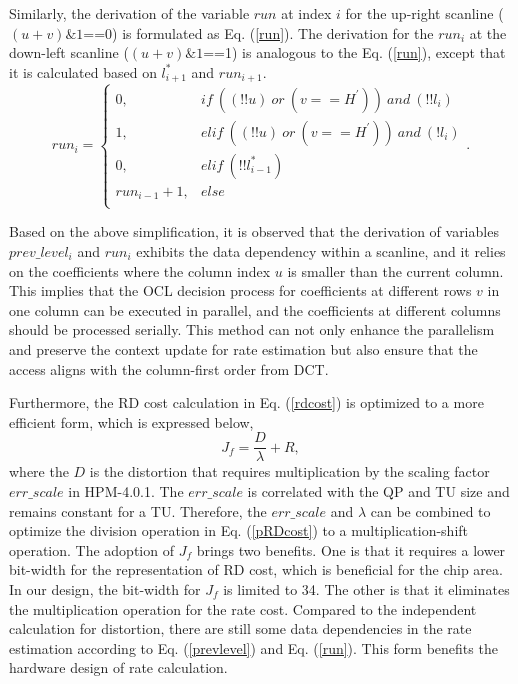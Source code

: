 \documentclass[lettersize,journal]{IEEEtran}
\begin{document}
Similarly, the derivation of the variable $run$ at index $i$ for the up-right scanline ($(u+v)\&1$==0) is formulated as Eq. (\ref{run}). The derivation for the $run_{i}$ at the down-left scanline ($(u+v)\&1$==1) is analogous to the Eq. (\ref{run}), except that it is calculated based on $l_{i+1}^{*}$ and $run_{i+1}$. 
\begin{equation}
	run_{i}=\begin{cases}
	\label{run}
	0,            & if \ ((!!u)\ or \ (v==H^{'}))\ and \ (!!l_{i}) \\
	1,            & elif \ ((!!u)\ or \ (v==H^{'}))\ and \ (!l_{i})\\
	0,            & elif \  (!!l_{i-1}^{*})\\
	run_{i-1}+1,  & else  \\
\end{cases} .
\end{equation}

Based on the above simplification, it is observed that the derivation of variables $prev\_level_{i}$ and $run_{i}$ exhibits the data dependency within a scanline, and it relies on the coefficients where the column index $u$ is smaller than the current column. This implies that the OCL decision process for coefficients at different rows $v$ in one column can be executed in parallel, and the coefficients at different columns should be processed serially. This method can not only enhance the parallelism and preserve the context update for rate estimation but also ensure that the access aligns with the column-first order from DCT. 

Furthermore, the RD cost calculation in Eq. (\ref{rdcost}) is optimized to a more efficient form, which is expressed below, 
\begin{equation}
    J_{f} =\frac{D}{\lambda } + R,
	\label{pRDcost}
\end{equation}
where the $D$ is the distortion that requires multiplication by the scaling factor $err\_scale$ in HPM-4.0.1. The $err\_scale$ is correlated with the QP and TU size and remains constant for a TU. Therefore, the $err\_scale$ and $\lambda$ can be combined to optimize the division operation in Eq. (\ref{pRDcost}) to a multiplication-shift operation. The adoption of $J_{f}$ brings two benefits. One is that it requires a lower bit-width for the representation of RD cost, which is beneficial for the chip area. In our design, the bit-width for $J_{f}$ is limited to 34. The other is that it eliminates the multiplication operation for the rate cost. Compared to the independent calculation for distortion, there are still some data dependencies in the rate estimation according to Eq. (\ref{prevlevel}) and Eq. (\ref{run}). This form benefits the hardware design of rate calculation. 
\end{document}
